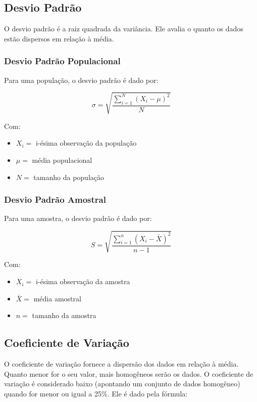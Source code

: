 \documentclass[
]{estat/estat}
\begin{document}
\subsection{Desvio Padrão}\label{desvio-padruxe3o}

O desvio padrão é a raiz quadrada da variância. Ele avalia o quanto os
dados estão dispersos em relação à média.

\subsubsection{Desvio Padrão
Populacional}\label{desvio-padruxe3o-populacional}

Para uma população, o desvio padrão é dado por:

\[\sigma=\sqrt{\frac{\sum\limits_{i=1}^{N}\left(X_i - \mu\right)^2}{N}}\]

Com:

\begin{itemize}
\item
  \(X_i =\) i-ésima observação da população
\item
  \(\mu =\) média populacional
\item
  \(N =\) tamanho da população
\end{itemize}

\subsubsection{Desvio Padrão Amostral}\label{desvio-padruxe3o-amostral}

Para uma amostra, o desvio padrão é dado por:

\[S=\sqrt{\frac{\sum\limits_{i=1}^{n}\left(X_i - \bar{X}\right)^2}{n-1}}\]

Com:

\begin{itemize}
\item
  \(X_i =\) i-ésima observação da amostra
\item
  \(\bar{X} =\) média amostral
\item
  \(n =\) tamanho da amostra
\end{itemize}

\subsection{Coeficiente de
Variação}\label{coeficiente-de-variauxe7uxe3o}

O coeficiente de variação fornece a dispersão dos dados em relação à
média. Quanto menor for o seu valor, mais homogêneos serão os dados. O
coeficiente de variação é considerado baixo (apontando um conjunto de
dados homogêneo) quando for menor ou igual a 25\%. Ele é dado pela
fórmula:
\end{document}
